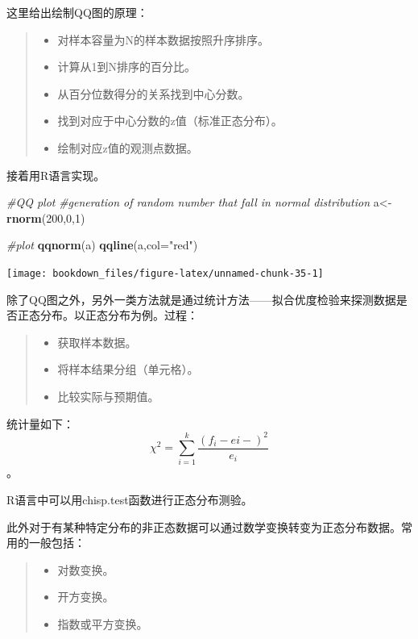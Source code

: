 \documentclass[]{ctexbook}
\newenvironment{Shaded}{\begin{snugshade}}{\end{snugshade}}
\newcommand{\CommentTok}[1]{\textcolor[rgb]{0.56,0.35,0.01}{\textit{#1}}}
\newcommand{\DataTypeTok}[1]{\textcolor[rgb]{0.13,0.29,0.53}{#1}}
\newcommand{\DecValTok}[1]{\textcolor[rgb]{0.00,0.00,0.81}{#1}}
\newcommand{\KeywordTok}[1]{\textcolor[rgb]{0.13,0.29,0.53}{\textbf{#1}}}
\newcommand{\NormalTok}[1]{#1}
\newcommand{\StringTok}[1]{\textcolor[rgb]{0.31,0.60,0.02}{#1}}
\providecommand{\tightlist}{%
  \setlength{\itemsep}{0pt}\setlength{\parskip}{0pt}}
\begin{document}
这里给出绘制QQ图的原理：

\begin{quote}
\begin{itemize}
\tightlist
\item
  对样本容量为N的样本数据按照升序排序。
\item
  计算从1到N排序的百分比。
\item
  从百分位数得分的关系找到中心分数。
\item
  找到对应于中心分数的z值（标准正态分布）。
\item
  绘制对应z值的观测点数据。
\end{itemize}
\end{quote}

接着用R语言实现。

\begin{Shaded}
\begin{Highlighting}[]
\CommentTok{#QQ plot}
\CommentTok{#generation of random number that fall in normal distribution}
\NormalTok{a<-}\KeywordTok{rnorm}\NormalTok{(}\DecValTok{200}\NormalTok{,}\DecValTok{0}\NormalTok{,}\DecValTok{1}\NormalTok{)}

\CommentTok{#plot}
\KeywordTok{qqnorm}\NormalTok{(a)}
\KeywordTok{qqline}\NormalTok{(a,}\DataTypeTok{col=}\StringTok{"red"}\NormalTok{)}
\end{Highlighting}
\end{Shaded}

\texttt{[image: bookdown\_files/figure-latex/unnamed-chunk-35-1]}

除了QQ图之外，另外一类方法就是通过统计方法------拟合优度检验来探测数据是否正态分布。以正态分布为例。过程：

\begin{quote}
\begin{itemize}
\tightlist
\item
  获取样本数据。
\item
  将样本结果分组（单元格）。
\item
  比较实际与预期值。
\end{itemize}
\end{quote}

统计量如下：
\[\chi^2=\sum_{i=1}^k\frac{(f_i-ei-)^2}{e_i}\]。

R语言中可以用chisp.test函数进行正态分布测验。

此外对于有某种特定分布的非正态数据可以通过数学变换转变为正态分布数据。常用的一般包括：

\begin{quote}
\begin{itemize}
\tightlist
\item
  对数变换。
\item
  开方变换。
\item
  指数或平方变换。
\end{itemize}
\end{quote}
\end{document}
